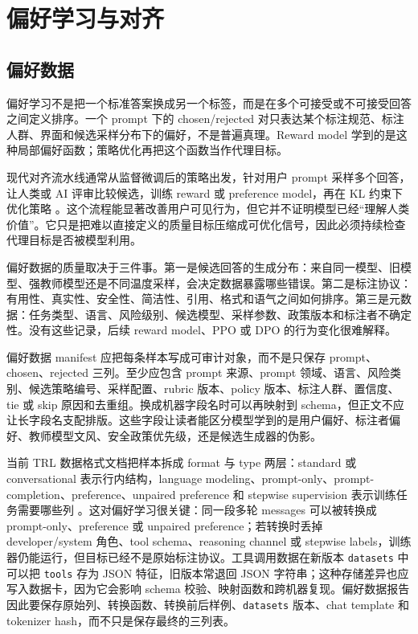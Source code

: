 \documentclass[UTF8,zihao=-4,openany]{ctexbook}
\begin{document}
\chapter{偏好学习与对齐}
\section{偏好数据}
偏好学习不是把一个标准答案换成另一个标签，而是在多个可接受或不可接受回答之间定义排序。一个 prompt 下的 chosen/rejected 对只表达某个标注规范、标注人群、界面和候选采样分布下的偏好，不是普遍真理。Reward model 学到的是这种局部偏好函数；策略优化再把这个函数当作代理目标。

现代对齐流水线通常从监督微调后的策略出发，针对用户 prompt 采样多个回答，让人类或 AI 评审比较候选，训练 reward 或 preference model，再在 KL 约束下优化策略 \cite{christiano2017deep,ziegler2019finetuning,stiennon2020learning,ouyang2022training}。这个流程能显著改善用户可见行为，但它并不证明模型已经“理解人类价值”。它只是把难以直接定义的质量目标压缩成可优化信号，因此必须持续检查代理目标是否被模型利用。

偏好数据的质量取决于三件事。第一是候选回答的生成分布：来自同一模型、旧模型、强教师模型还是不同温度采样，会决定数据暴露哪些错误。第二是标注协议：有用性、真实性、安全性、简洁性、引用、格式和语气之间如何排序。第三是元数据：任务类型、语言、风险级别、候选模型、采样参数、政策版本和标注者不确定性。没有这些记录，后续 reward model、PPO 或 DPO 的行为变化很难解释。

偏好数据 manifest 应把每条样本写成可审计对象，而不是只保存 prompt、chosen、rejected 三列。至少应包含 prompt 来源、prompt 领域、语言、风险类别、候选策略编号、采样配置、rubric 版本、policy 版本、标注人群、置信度、tie 或 skip 原因和去重组。换成机器字段名时可以再映射到 schema，但正文不应让长字段名支配排版。这些字段让读者能区分模型学到的是用户偏好、标注者偏好、教师模型文风、安全政策优先级，还是候选生成器的伪影。

当前 TRL 数据格式文档把样本拆成 format 与 type 两层：standard 或 conversational 表示行内结构，language modeling、prompt-only、prompt-completion、preference、unpaired preference 和 stepwise supervision 表示训练任务需要哪些列 \cite{huggingface2026trldatasetformats}。这对偏好学习很关键：同一段多轮 messages 可以被转换成 prompt-only、preference 或 unpaired preference；若转换时丢掉 developer/system 角色、tool schema、reasoning channel 或 stepwise labels，训练器仍能运行，但目标已经不是原始标注协议。工具调用数据在新版本 \texttt{datasets} 中可以把 \texttt{tools} 存为 JSON 特征，旧版本常退回 JSON 字符串；这种存储差异也应写入数据卡，因为它会影响 schema 校验、映射函数和跨机器复现。偏好数据报告因此要保存原始列、转换函数、转换前后样例、\texttt{datasets} 版本、chat template 和 tokenizer hash，而不只是保存最终的三列表。
\end{document}

